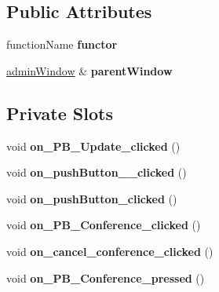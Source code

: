 \subsection*{Public Attributes}
\begin{DoxyCompactItemize}
\item 
\mbox{\label{classmodify_stadium_info_ab32435bf01e518d616cff085b9de5831}} 
function\+Name {\bfseries functor}
\item 
\mbox{\label{classmodify_stadium_info_a8aeef91cabb8db2b4b3810cd0aaa14a4}} 
\hyperlink{classadmin_window}{admin\+Window} \& {\bfseries parent\+Window}
\end{DoxyCompactItemize}
\subsection*{Private Slots}
\begin{DoxyCompactItemize}
\item 
\mbox{\label{classmodify_stadium_info_a22af306c4ec113b980764cbc434121d7}} 
void {\bfseries on\+\_\+\+P\+B\+\_\+\+Update\+\_\+clicked} ()
\item 
\mbox{\label{classmodify_stadium_info_ab76af639ca542e2c067674a50da82f69}} 
void {\bfseries on\+\_\+push\+Button\+\_\+\_\+clicked} ()
\item 
\mbox{\label{classmodify_stadium_info_a80877d8967425a8654a5aa62eecf3412}} 
void {\bfseries on\+\_\+push\+Button\+\_\+clicked} ()
\item 
\mbox{\label{classmodify_stadium_info_aebbbe8574a0c7bca07a8f297412a1cdd}} 
void {\bfseries on\+\_\+\+P\+B\+\_\+\+Conference\+\_\+clicked} ()
\item 
\mbox{\label{classmodify_stadium_info_a3342812eadbf4f305cf9e2c500974c23}} 
void {\bfseries on\+\_\+cancel\+\_\+conference\+\_\+clicked} ()
\item 
\mbox{\label{classmodify_stadium_info_a30f2b386fd45a884382372c95a80c330}} 
void {\bfseries on\+\_\+\+P\+B\+\_\+\+Conference\+\_\+pressed} ()
\end{DoxyCompactItemize}
